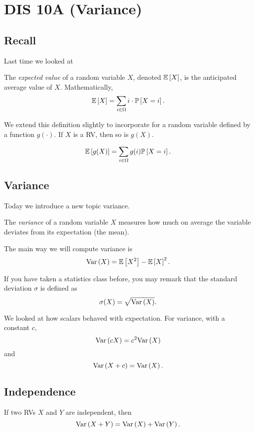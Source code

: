 \section{DIS 10A (Variance)}

\subsection{Recall}
Last time we looked at 
\begin{definition}
    The \textit{expected value} of a random variable $X$, denoted $\mathbb{E}\left[ X \right]$, is the anticipated average value of $X$. Mathematically, \[ \mathbb{E}\left[ X \right] = \sum_{i \in \Omega} i \cdot \mathbb{P}\left[ X = i \right]. \]
\end{definition}

We extend this definition slightly to incorporate for a random variable defined by a function $g(\cdot)$. If $X$ is a RV, then so is $g(X)$. 

\begin{theorem}
    \[ \mathbb{E}\left[ g(X) \right] = \sum_{i \in \Omega} g(i) \mathbb{P}\left[ X = i \right]. \]
\end{theorem}

\subsection{Variance}

Today we introduce a new topic variance. 

\begin{definition}[Variance]
    The \textit{variance} of a random variable $X$ measures how much on average the variable deviates from its expectation (the mean).
\end{definition}

The main way we will compute variance is \[ \text{Var}\left( X \right) = \mathbb{E}\left[ X^2 \right] - \mathbb{E}\left[ X \right]^2. \]

If you have taken a statistics class before, you may remark that the standard deviation $\sigma$ is defined as \[ \sigma(X) = \sqrt{\text{Var}\left( X \right)}. \]

We looked at how scalars behaved with expectation. For variance, with a constant $c$, \[ \text{Var}\left( cX \right) = c^2 \text{Var}\left( X \right) \] and \[ \text{Var}\left( X + c \right) = \text{Var}\left( X \right). \]

\subsection{Independence}

If two RVs $X$ and $Y$ are independent, then \[ \text{Var}\left( X+Y \right) = \text{Var}\left( X \right) + \text{Var}\left( Y \right). \]